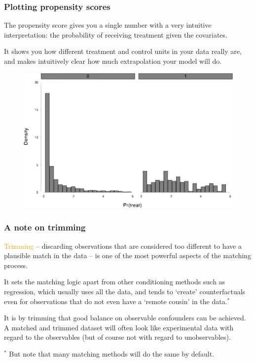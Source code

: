 \documentclass[12pt,english,dvipsnames,aspectratio=169,handout]{beamer}\usepackage[]{graphicx}\usepackage[]{xcolor}
\begin{document}
\begin{frame}
  \frametitle{Plotting propensity scores}
\footnotesize
  
The propensity score gives you a single number with a very intuitive interpretation: the probability of receiving treatment given the covariates. 

It shows you how different treatment and control units in your data really are, and makes intuitively clear how much extrapolation your model will do. 

	 \begin{figure} 
    \includegraphics[height=.5\textheight,keepaspectratio=true]{../04-figures/06/02-hist_pscores_t}
    \end{figure}

\end{frame}



\begin{frame}
  \frametitle{A note on trimming}
\footnotesize

\textcolor{orange}{Trimming} -- discarding observations that are considered too different to have a plausible match in the data -- is one of the most powerful aspects of the matching process.

It sets the matching logic apart from other conditioning methods such as regression, which usually uses all the data, and tends to `create' counterfactuals even for observations that do not even have a `remote cousin' in the data.$^*$

It is by trimming that good balance on observable confounders can be achieved. A matched and trimmed dataset will often look like experimental data with regard to the observables (but of course not with regard to unobservables).

\scriptsize
$^*$ But note that many matching methods will do the same by default.

\end{frame}
\end{document}
